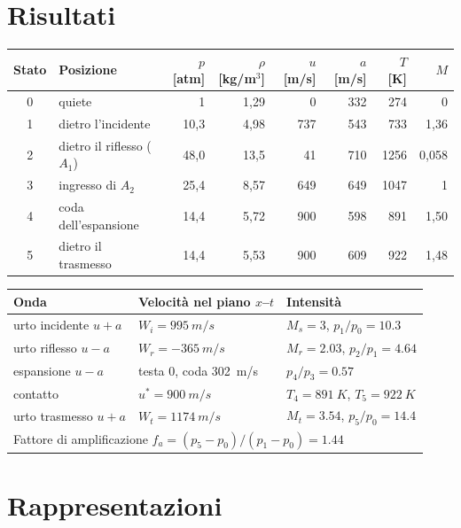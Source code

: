 \documentclass[11pt,a4paper]{article}
\newcommand{\uma}{u-a}
\newcommand{\upa}{u+a}
\newcommand{\Mr}{M_{r}}
\newcommand{\fa}{f_a}
\begin{document}
\section{Risultati}
\begin{table}[H]
  \centering
  \begin{tabular}{clrrrrrr}
    \toprule
    Stato & Posizione & $p$ [atm] & $\rho$ [kg/m$^3$] & $u$ [m/s] & $a$ [m/s] & $T$ [K] & $M$ \\
    \midrule
    0 & quiete & 1 & 1,29 & 0 & 332 & 274 & 0 \\
    1 & dietro l'incidente & 10,3 & 4,98 & 737 & 543 & 733 & 1,36 \\
    2 & dietro il riflesso ($A_1$) & 48,0 & 13,5 & 41 & 710 & 1256 & 0,058 \\
    3 & ingresso di $A_2$ & 25,4 & 8,57 & 649 & 649 & 1047 & 1 \\
    4 & coda dell'espansione & 14,4 & 5,72 & 900 & 598 & 891 & 1,50 \\
    5 & dietro il trasmesso & 14,4 & 5,53 & 900 & 609 & 922 & 1,48 \\
    \bottomrule
  \end{tabular}
\end{table}
\begin{table}[H]
  \centering
  \begin{tabular}{lll}
    \toprule
    Onda & Velocità nel piano $x$--$t$ & Intensità \\
    \midrule
    urto incidente $\upa$ & $W_i=\SI{995}{m/s}$ & $M_s=3$, $p_1/p_0=\num{10.3}$ \\
    urto riflesso $\uma$ & $W_r=\SI{-365}{m/s}$ & $\Mr=\num{2.03}$, $p_2/p_1=\num{4.64}$ \\
    espansione $\uma$ & testa 0, coda \SI{302}{m/s} & $p_4/p_3=\num{0.57}$ \\
    contatto & $u^*=\SI{900}{m/s}$ & $T_4=\SI{891}{K}$, $T_5=\SI{922}{K}$ \\
    urto trasmesso $\upa$ & $W_t=\SI{1174}{m/s}$ & $M_t=\num{3.54}$, $p_5/p_0=\num{14.4}$ \\
    \midrule
    \multicolumn{3}{l}{Fattore di amplificazione $\fa=(p_5-p_0)/(p_1-p_0)=\num{1.44}$} \\
    \bottomrule
  \end{tabular}
\end{table}

\section{Rappresentazioni}\label{sec:rappr}
\end{document}

